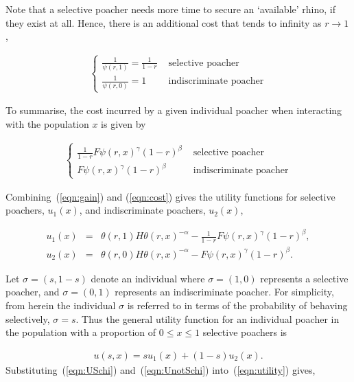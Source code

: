 \documentclass[10pt]{article}
\begin{document}
Note that a selective poacher needs
more time to secure an `available' rhino, if they exist at all. Hence, there is
an additional cost that tends to infinity as \(r \rightarrow 1\),

\begin{eqnarray}
    \label{eqn:selective_cost}
    \left\{
    \begin{array}{cl}
    \frac{1}{\psi(r, 1)} = \frac{1}{1 - r} & \mbox{ selective poacher}
    \\
    \frac{1}{\psi(r, 0)} = 1 & \mbox{ indiscriminate poacher}
    \end{array} \right.
\end{eqnarray}

To summarise, the cost incurred by a given individual poacher when interacting
with the population \(x\) is given by 

\begin{eqnarray}
    \label{eqn:cost}
    \left\{
    \begin{array}{cl}
    \frac{1}{1 - r}  F\psi(r, x)^{\gamma} (1-r)^{\beta}& \mbox{ selective poacher}
    \\
    F\psi(r, x)^{\gamma} (1-r)^{\beta}& \mbox{ indiscriminate poacher}
    \end{array} \right.
\end{eqnarray}

Combining~(\ref{eqn:gain}) and (\ref{eqn:cost}) gives the utility functions for
selective poachers, \(u_1(x)\), and indiscriminate poachers, \(u_2(x)\), 

\begin{eqnarray} 
\label{eqn:USchi}
u_1(x) &=& \theta(r,1) H \theta(r,x)^{-\alpha}
- \frac{1}{1- r} F\psi(r, x)^{\gamma} (1-r)^{\beta} ,
\\
\label{eqn:UnotSchi}
u_2(x) &=& \theta(r,0) H \theta(r,x)^{-\alpha}
- F\psi(r, x)^{\gamma}  (1-r)^{\beta}.
\end{eqnarray}


Let \(\sigma=(s, 1 - s)\) denote an individual where \(\sigma =(1, 0)\) represents
a selective poacher, and \(\sigma=(0, 1)\) represents an indiscriminate poacher.
For simplicity, from herein the individual \(\sigma\) is referred to in terms
of the probability of behaving selectively, \(\sigma=s\).
Thus the general utility function for an individual poacher in the population with
a proportion of \(0 \leq x \leq 1\) selective poachers is

\begin{eqnarray}
\label{eqn:utility}
u(s, x) = s u_1(x) +(1 - s) u_2(x).
\end{eqnarray}
Substituting~(\ref{eqn:USchi}) and~(\ref{eqn:UnotSchi}) into~(\ref{eqn:utility}) 
gives,
\end{document}
